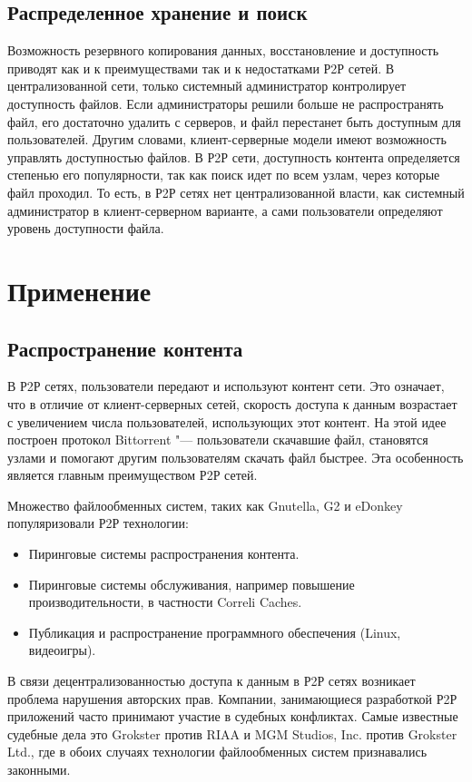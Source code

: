 \documentclass[bachelor, och, coursework]{SCWorks}
\begin{document}
\subsection{Распределенное хранение и поиск}
Возможность резервного копирования данных, восстановление и доступность приводят как и к преимуществами так и к недостатками Р2Р сетей. В централизованной сети, только системный администратор контролирует доступность файлов. Если администраторы решили больше не распространять файл, его достаточно удалить с серверов, и файл перестанет быть доступным для пользователей. Другим словами, клиент-серверные модели имеют возможность управлять доступностью файлов. В Р2Р сети, доступность контента определяется степенью его популярности, так как поиск идет по всем узлам, через которые файл проходил. То есть, в Р2Р сетях нет централизованной власти, как системный администратор в клиент-серверном варианте, а сами пользователи определяют уровень доступности файла.

\section{Применение}
\subsection{Распространение контента}
В Р2Р сетях, пользователи передают и используют контент сети. Это означает, что в отличие от клиент-серверных сетей, скорость доступа к данным возрастает с увеличением числа пользователей, использующих этот контент. На этой идее построен протокол Bittorrent "--- пользователи скачавшие файл, становятся узлами и помогают другим пользователям скачать файл быстрее. Эта особенность является главным преимуществом Р2Р сетей.

Множество файлообменных систем, таких как Gnutella, G2 и eDonkey популяризовали Р2Р технологии:
\begin{itemize}
    \item Пиринговые системы распространения контента.
    \item Пиринговые системы обслуживания, например повышение производительности, в частности Correli Caches.
    \item Публикация и распространение программного обеспечения (Linux, видеоигры).
\end{itemize}

В связи децентрализованностью доступа к данным в Р2Р сетях возникает проблема нарушения авторских прав. Компании, занимающиеся разработкой Р2Р приложений часто принимают участие в судебных конфликтах. Самые известные судебные дела это Grokster против RIAA и MGM Studios, Inc. против Grokster Ltd., где в обоих случаях технологии файлообменных систем признавались законными.
\end{document}
